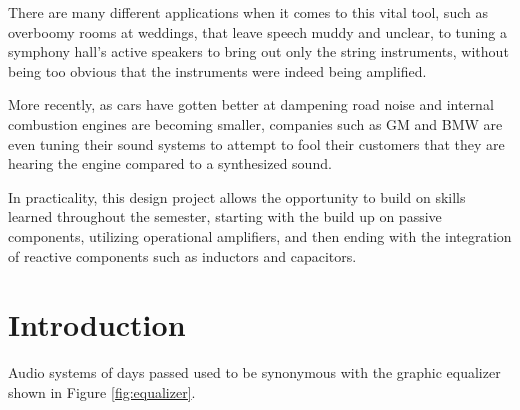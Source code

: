 \documentclass[12pt]{article}
\begin{document}
There are many different applications when it comes to this vital tool, such as overboomy rooms at weddings, that leave speech muddy and unclear, to tuning a symphony hall's active speakers to bring out only the string instruments, without being too obvious that the instruments were indeed being amplified.

More recently, as cars have gotten better at dampening road noise and internal combustion engines are becoming smaller, companies such as GM and BMW are even tuning their sound systems to attempt to fool their customers that they are hearing the engine compared to a synthesized sound.

In practicality, this design project allows the opportunity to build on skills learned throughout the semester, starting with the build up on passive components, utilizing operational amplifiers, and then ending with the integration of reactive components such as inductors and capacitors.

\newpage
\section{Introduction}
Audio systems of days passed used to be synonymous with the graphic equalizer shown in Figure \ref{fig:equalizer}.
\end{document}

